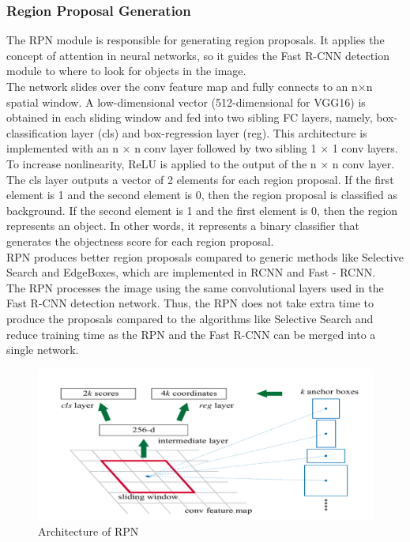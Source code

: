         \subsubsection{Region Proposal Generation}
            The RPN module is responsible for generating region proposals. It applies the concept of attention in neural networks, so it guides the Fast R-CNN detection module to where to look for objects in the image. \\ 
            \vspace{3mm}
            The network slides over the conv feature map and fully connects to an n×n spatial window. A low-dimensional vector (512-dimensional for VGG16) is obtained in each sliding window and fed into two sibling FC layers, namely, box-classification layer (cls) and box-regression layer (reg). This architecture is implemented with an n × n conv layer followed by two sibling 1 × 1 conv layers. To increase nonlinearity, ReLU is applied to the output of the n × n conv layer. \\ 
            \vspace{3mm}
            The cls layer outputs a vector of 2 elements for each region proposal. If the first element is 1 and the second element is 0, then the region proposal is classified as background. If the second element is 1 and the first element is 0, then the region represents an object. In other words, it represents a binary classifier that generates the objectness score for each region proposal. \\ 
            \vspace{3mm}
            RPN produces better region proposals compared to generic methods like Selective Search and EdgeBoxes, which are implemented in RCNN and Fast - RCNN. \\ 
            \vspace{3mm}
            The RPN processes the image using the same convolutional layers used in the Fast R-CNN detection network. Thus, the RPN does not take extra time to produce the proposals compared to the algorithms like Selective Search and reduce training time as the RPN and the Fast R-CNN can be merged into a single network.
            \begin{figure}[H]
                \centering
                \includegraphics[width=0.6\linewidth]{img/RPN.png}
                \caption{Architecture of RPN}
            \end{figure}
